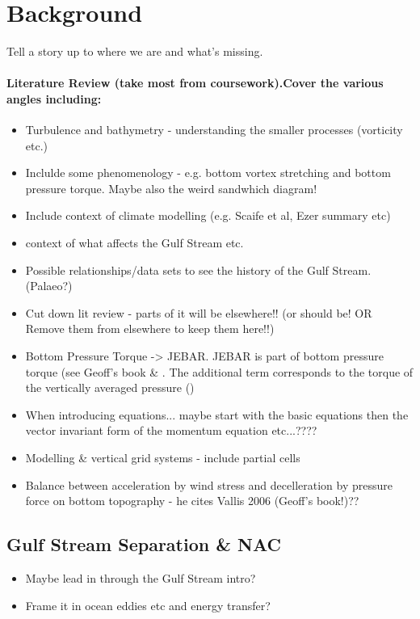 \documentclass[..\EOYR.tex]{subfiles}
\begin{document}
\section{Background}
Tell a story up to where we are and what's missing.
\paragraph{Literature Review (take most from coursework).Cover the various angles including:}
\begin{itemize}
  \item Turbulence and bathymetry - understanding the smaller processes (vorticity etc.) \citep{Tansley2001} \citep{Nikurashin2012a}
  \item Inclulde some phenomenology - e.g. bottom vortex stretching and bottom pressure torque. Maybe also the weird sandwhich diagram!
  \item Include context of climate modelling (e.g. Scaife et al, Ezer summary etc)
  \item context of what affects the Gulf Stream etc.
  \item Possible relationships/data sets to see the history of the Gulf Stream. (Palaeo?) \citep{Ezer2015}
  \item Cut down lit review - parts of it will be elsewhere!! (or should be! OR Remove them from elsewhere to keep them here!!)
    \item Bottom Pressure Torque -> JEBAR. JEBAR is part of bottom pressure torque (see Geoff's book \& \citep{Greatbatch1991}. The additional term corresponds to the torque of the vertically averaged pressure (\citep{Greatbatch1991})
    \item When introducing equations... maybe start with the basic equations then the vector invariant form of the momentum equation etc...????
  \item Modelling \& vertical grid systems - include partial cells
  \item Balance between acceleration by wind stress and decelleration by pressure force on bottom topography \citep{NaveiraGarabato2013} - he cites Vallis 2006 (Geoff's book!)??
\end{itemize}


\subsection{Gulf Stream Separation \& NAC}
\begin{itemize}
    \item Maybe lead in through the Gulf Stream intro?
    \item Frame it in ocean eddies etc and energy transfer?
\end{itemize}
\end{document}
